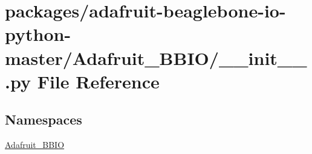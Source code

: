 \hypertarget{packages_2adafruit-beaglebone-io-python-master_2Adafruit__BBIO_2____init_____8py}{}\section{packages/adafruit-\/beaglebone-\/io-\/python-\/master/\+Adafruit\+\_\+\+B\+B\+I\+O/\+\_\+\+\_\+init\+\_\+\+\_\+.py File Reference}
\label{packages_2adafruit-beaglebone-io-python-master_2Adafruit__BBIO_2____init_____8py}
\subsection*{Namespaces}
\begin{DoxyCompactItemize}
\item 
 \hyperlink{namespaceAdafruit__BBIO}{Adafruit\+\_\+\+B\+B\+I\+O}
\end{DoxyCompactItemize}
